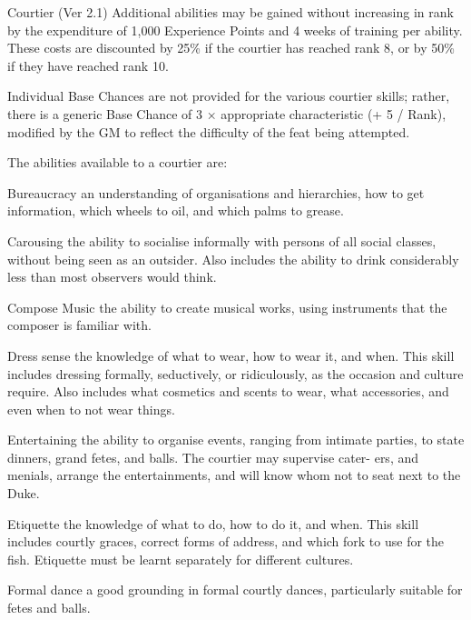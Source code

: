 \begin{Chapter}{Courtier (Ver 2.1)}
Additional abilities may be gained without increasing in rank by the
expenditure of 1,000 Experience Points and 4 weeks of training per
ability.  These costs are discounted by 25\% if the courtier has
reached rank 8, or by 50\% if they have reached rank 10.

Individual Base Chances are not provided for the various courtier
skills; rather, there is a generic Base Chance of 3 × appropriate
characteristic (+ 5 / Rank), modified by the GM to reflect the
difficulty of the feat being attempted.

The abilities available to a courtier are:

\begin{Description}
\item[Bureaucracy] an understanding of organisations and hierarchies,
  how to get information, which wheels to oil, and which palms to
  grease.

\item[Carousing] the ability to socialise informally with persons of
  all social classes, without being seen as an outsider.  Also
  includes the ability to drink considerably less than most observers
  would think.

\item[Compose Music] the ability to create musical works, using
  instruments that the composer is familiar with.

\item[Dress sense] the knowledge of what to wear, how to wear it, and
  when.  This skill includes dressing formally, seductively, or
  ridiculously, as the occasion and culture require.  Also includes
  what cosmetics and scents to wear, what accessories, and even when
  to not wear things.

\item[Entertaining] the ability to organise events, ranging from
  intimate parties, to state dinners, grand fetes, and balls.  The
  courtier may supervise cater- ers, and menials, arrange the
  entertainments, and will know whom not to seat next to the Duke.

\item[Etiquette] the knowledge of what to do, how to do it, and when.
  This skill includes courtly graces, correct forms of address, and
  which fork to use for the fish.  Etiquette must be learnt separately
  for different cultures.

\item[Formal dance] a good grounding in formal courtly dances,
  particularly suitable for fetes and balls.


\end{Description}
\end{Chapter}
